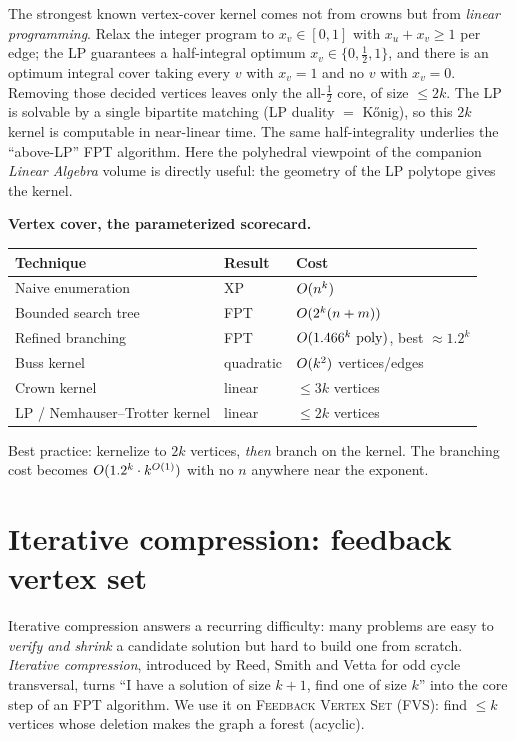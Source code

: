 \begin{connectionbox}
The strongest known vertex-cover kernel comes not from crowns but from \emph{linear programming}. Relax the integer program to $x_v\in[0,1]$ with $x_u+x_v\ge 1$ per edge; the LP guarantees a half-integral optimum $x_v\in\{0,\tfrac12,1\}$, and there is an optimum integral cover taking every $v$ with $x_v=1$ and no $v$ with $x_v=0$. Removing those decided vertices leaves only the all-$\tfrac12$ core, of size $\le 2k$. The LP is solvable by a single bipartite matching (LP duality $=$ K\H{o}nig), so this $2k$ kernel is computable in near-linear time. The same half-integrality underlies the ``above-LP'' FPT algorithm. Here the polyhedral viewpoint of the companion \emph{Linear Algebra} volume is directly useful: the geometry of the LP polytope gives the kernel.
\end{connectionbox}

\begin{complexitybox}
\textbf{Vertex cover, the parameterized scorecard.}
\begin{center}
\begin{tabular}{lll}
\toprule
Technique & Result & Cost \\
\midrule
Naive enumeration & XP & $O(n^k)$ \\
Bounded search tree & FPT & $O(2^k(n+m))$ \\
Refined branching & FPT & $O(1.466^k\,\operatorname{poly})$, best $\approx 1.2^k$ \\
Buss kernel & quadratic & $O(k^2)$ vertices/edges \\
Crown kernel & linear & $\le 3k$ vertices \\
LP / Nemhauser--Trotter kernel & linear & $\le 2k$ vertices \\
\bottomrule
\end{tabular}
\end{center}
Best practice: kernelize to $2k$ vertices, \emph{then} branch on the kernel. The branching cost becomes $O(1.2^k\cdot k^{O(1)})$ with no $n$ anywhere near the exponent.
\end{complexitybox}

\section{Iterative compression: feedback vertex set}

Iterative compression answers a recurring difficulty: many problems are easy to \emph{verify and shrink} a candidate solution but hard to build one from scratch. \emph{Iterative compression}, introduced by Reed, Smith and Vetta for odd cycle transversal, turns ``I have a solution of size $k+1$, find one of size $k$'' into the core step of an FPT algorithm. We use it on \textsc{Feedback Vertex Set} (FVS): find $\le k$ vertices whose deletion makes the graph a forest (acyclic).


